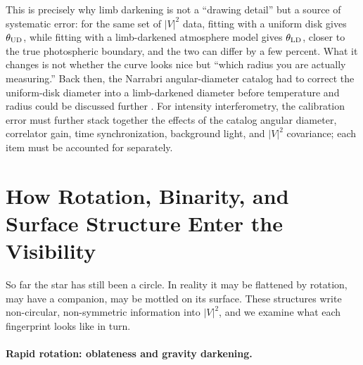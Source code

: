 This is precisely why limb darkening is not a ``drawing detail'' but a source of systematic error: for the same set of \(|V|^2\) data, fitting with a uniform disk gives \(\theta_{\rm UD}\), while fitting with a limb-darkened atmosphere model gives \(\theta_{\rm LD}\), closer to the true photospheric boundary, and the two can differ by a few percent. What it changes is not whether the curve looks nice but ``which radius you are actually measuring.'' Back then, the Narrabri angular-diameter catalog had to correct the uniform-disk diameter into a limb-darkened diameter before temperature and radius could be discussed further \citep{1974MNRAS.167..121H,1974MNRAS.167..475H}. For intensity interferometry, the calibration error must further stack together the effects of the catalog angular diameter, correlator gain, time synchronization, background light, and \(|V|^2\) covariance; each item must be accounted for separately.

\section{How Rotation, Binarity, and Surface Structure Enter the Visibility}
\label{sec:e17-rotation-binary}

So far the star has still been a circle. In reality it may be flattened by rotation, may have a companion, may be mottled on its surface. These structures write non-circular, non-symmetric information into \(|V|^2\), and we examine what each fingerprint looks like in turn.

\paragraph{Rapid rotation: oblateness and gravity darkening.}
\label{sec:e17-rotation}

